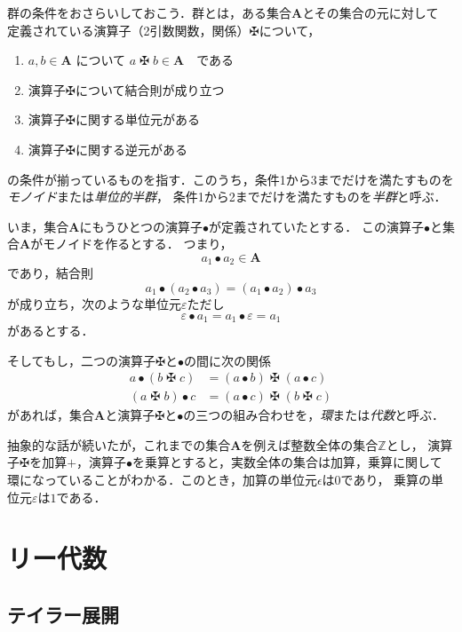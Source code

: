 \documentclass{jsbook}
\newcommand{\keyword}[1]{\emph{#1}}
\newcommand{\bop}[1]{\boldsymbol{#1}}
\newcommand{\bg}[1]{\mathbf{#1}}
\newcommand{\opmaltese}{\mathop{\maltese}}
\begin{document}
群の条件をおさらいしておこう．群とは，ある集合$\bg{A}$とその集合の元に対して
定義されている演算子（2引数関数，関係）$\maltese$について，
\begin{enumerate}
\item $a,b\in\bg{A}$ について $a\opmaltese b\in\bop{A}$　である
\item 演算子$\maltese$について結合則が成り立つ
\item 演算子$\maltese$に関する単位元がある
\item 演算子$\maltese$に関する逆元がある
\end{enumerate}
の条件が揃っているものを指す．このうち，条件1から3までだけを満たすものを\keyword{モノイド}または\keyword{単位的半群}，
条件1から2までだけを満たすものを\keyword{半群}と呼ぶ．

いま，集合$\bg{A}$にもうひとつの演算子$\bullet$が定義されていたとする．
この演算子$\bullet$と集合$\bg{A}$がモノイドを作るとする．
つまり，
\begin{equation}
a_1\bullet a_2\in\bg{A}
\end{equation}
であり，結合則
\begin{equation}
a_1\bullet(a_2\bullet a_3)=(a_1\bullet a_2)\bullet a_3
\end{equation}
が成り立ち，次のような単位元$\varepsilon$ただし
\begin{equation}
\varepsilon\bullet a_1=a_1\bullet\varepsilon=a_1
\end{equation}
があるとする．

そしてもし，二つの演算子$\maltese$と$\bullet$の間に次の関係
\begin{align}
a\bullet(b\opmaltese c)&=(a\bullet b)\opmaltese(a\bullet c)\\
(a\opmaltese b)\bullet c&=(a\bullet c)\opmaltese(b\opmaltese c)
\end{align}
があれば，集合$\bg{A}$と演算子$\maltese$と$\bullet$の三つの組み合わせを，\keyword{環}または\keyword{代数}と呼ぶ．

抽象的な話が続いたが，これまでの集合$\bg{A}$を例えば整数全体の集合$\mathbb{Z}$とし，
演算子$\maltese$を加算$+$，演算子$\bullet$を乗算とすると，実数全体の集合は加算，乗算に関して
環になっていることがわかる．このとき，加算の単位元$\epsilon$は$0$であり，
乗算の単位元$\varepsilon$は$1$である．


\chapter{リー代数}

\section{テイラー展開}
\end{document}
